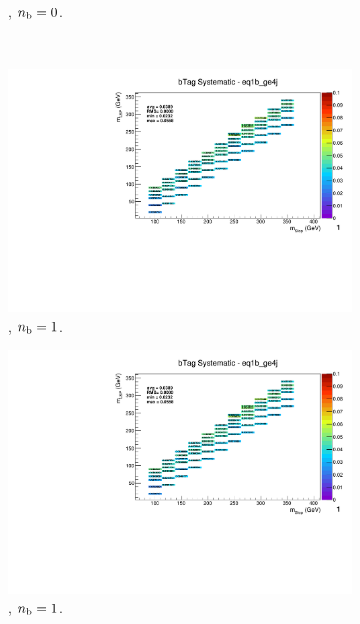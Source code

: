 \begin{figure}[ht!]
\begin{subfigure}[b]{0.32\textwidth}
    \caption{\njhigh, $n_{\text{b}} = 0$.}
  \end{subfigure}\\
  \begin{subfigure}[b]{0.32\textwidth}
    \includegraphics[width=\textwidth, page=14]{Figs/sms/t2cc/v37_3/systs/T2cc_bTag_eq1b_ge4j.pdf}
    \caption{\njhigh, $n_{\text{b}} = 1$.}
  \end{subfigure}
  \begin{subfigure}[b]{0.32\textwidth}
    \includegraphics[width=\textwidth, page=9]{Figs/sms/t2cc/v37_3/systs/T2cc_bTag_eq1b_ge4j.pdf}
    \caption{\njhigh, $n_{\text{b}} = 1$.}
  \end{subfigure}
  \begin{subfigure}[b]{0.32\textwidth}

\end{subfigure}
\end{figure}
